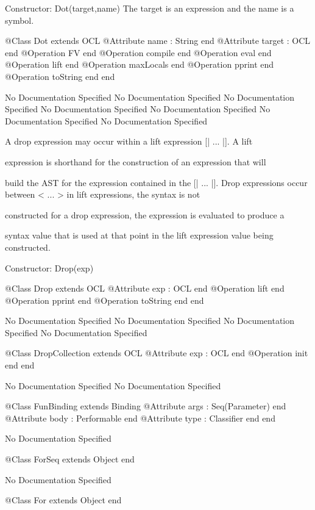       Constructor: Dot(target,name)
        The target is an expression and the name is a symbol.
\begin{Interface}
@Class Dot extends OCL
  @Attribute name : String end
  @Attribute target : OCL end
  @Operation FV end
  @Operation compile end
  @Operation eval end
  @Operation lift end
  @Operation maxLocals end
  @Operation pprint end
  @Operation toString end
end
\end{Interface}
No Documentation Specified
No Documentation Specified
No Documentation Specified
No Documentation Specified
No Documentation Specified
No Documentation Specified
No Documentation Specified

        A drop expression may occur within a lift expression [| ... |]. A lift

        expression is shorthand for the construction of an expression that will

        build the AST for the expression contained in the [| ... |]. Drop 
        expressions occur between < ... > in lift expressions, the syntax is not

        constructed for a drop expression, the expression is evaluated to produce a

        syntax value that is used at that point in the lift expression value being 
        constructed.
        
        Constructor: Drop(exp)
\begin{Interface}
@Class Drop extends OCL
  @Attribute exp : OCL end
  @Operation lift end
  @Operation pprint end
  @Operation toString end
end
\end{Interface}
No Documentation Specified
No Documentation Specified
No Documentation Specified
No Documentation Specified
\begin{Interface}
@Class DropCollection extends OCL
  @Attribute exp : OCL end
  @Operation init end
end
\end{Interface}
No Documentation Specified
No Documentation Specified
\begin{Interface}
@Class FunBinding extends Binding
  @Attribute args : Seq(Parameter) end
  @Attribute body : Performable end
  @Attribute type : Classifier end
end
\end{Interface}
No Documentation Specified
\begin{Interface}
@Class ForSeq extends Object
end
\end{Interface}
No Documentation Specified
\begin{Interface}
@Class For extends Object
end
\end{Interface}

